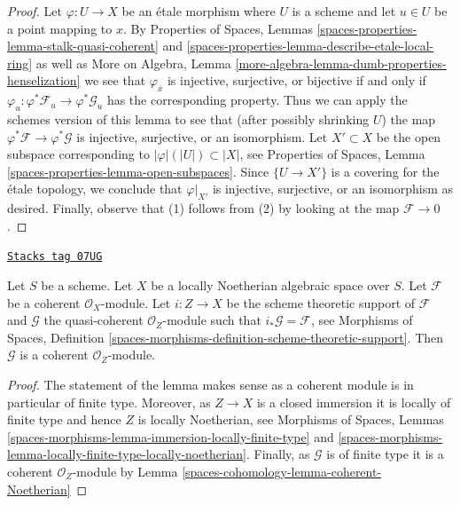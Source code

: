 \begin{proof}
Let $\varphi : U \to X$ be an \'etale morphism where $U$ is a scheme and
let $u \in U$ be a point mapping to $x$. By
Properties of Spaces, Lemmas
\ref{spaces-properties-lemma-stalk-quasi-coherent} and
\ref{spaces-properties-lemma-describe-etale-local-ring}
as well as
More on Algebra, Lemma \ref{more-algebra-lemma-dumb-properties-henselization}
we see that $\varphi_{\overline{x}}$ is injective, surjective, or bijective
if and only if $\varphi_u : \varphi^*\mathcal{F}_u \to \varphi^*\mathcal{G}_u$
has the corresponding property. Thus we can apply the schemes version of
this lemma to see that (after possibly shrinking $U$) the map
$\varphi^*\mathcal{F} \to \varphi^*\mathcal{G}$ is injective, surjective,
or an isomorphism. Let $X' \subset X$ be the open subspace corresponding
to $|\varphi|(|U|) \subset |X|$, see
Properties of Spaces, Lemma \ref{spaces-properties-lemma-open-subspaces}.
Since $\{U \to X'\}$ is a covering for the \'etale topology, we conclude
that $\varphi|_{X'}$ is injective, surjective, or an isomorphism as desired.
Finally, observe that (1) follows from (2) by looking at the map
$\mathcal{F} \to 0$.
\end{proof}

\begin{lemma}
\label{spaces-cohomology-lemma-coherent-support-closed}
\href{https://stacks.math.columbia.edu/tag/07UG}{\texttt{Stacks tag 07UG}}

Let $S$ be a scheme. Let $X$ be a locally Noetherian algebraic space over $S$.
Let $\mathcal{F}$ be a coherent $\mathcal{O}_X$-module. Let $i : Z \to X$
be the scheme theoretic support of $\mathcal{F}$ and $\mathcal{G}$
the quasi-coherent $\mathcal{O}_Z$-module such that
$i_*\mathcal{G} = \mathcal{F}$, see
Morphisms of Spaces, Definition
\ref{spaces-morphisms-definition-scheme-theoretic-support}.
Then $\mathcal{G}$ is a coherent $\mathcal{O}_Z$-module.
\end{lemma}

\begin{proof}
The statement of the lemma makes sense as a coherent module is in
particular of finite type. Moreover, as $Z \to X$ is a closed immersion
it is locally of finite type and hence $Z$ is locally Noetherian, see
Morphisms of Spaces, Lemmas
\ref{spaces-morphisms-lemma-immersion-locally-finite-type} and
\ref{spaces-morphisms-lemma-locally-finite-type-locally-noetherian}.
Finally, as $\mathcal{G}$ is of finite type it is a coherent
$\mathcal{O}_Z$-module by
Lemma \ref{spaces-cohomology-lemma-coherent-Noetherian}
\end{proof}

